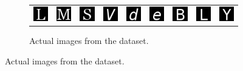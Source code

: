 \begin{figure}
	\begin{subfigure}[t]{\textwidth}
		\begin{tabu} to \textwidth {XXXXXXXXX}
			\includegraphics[scale=1]{tensors/sandc/valid/real/Georgia-76} &
			\includegraphics[scale=1]{tensors/sandc/valid/real/Georgia-77} &
			\includegraphics[scale=1]{tensors/sandc/valid/real/Georgia-83} &
			\includegraphics[scale=1]{tensors/sandc/valid/real/VeraMoIt-86} &
			\includegraphics[scale=1]{tensors/sandc/valid/real/VeraMoIt-100} &
			\includegraphics[scale=1]{tensors/sandc/valid/real/VeraMoIt-101} &
			\includegraphics[scale=1]{tensors/sandc/valid/real/VeraMono-66} &
			\includegraphics[scale=1]{tensors/sandc/valid/real/VeraMono-76} &
			\includegraphics[scale=1]{tensors/sandc/valid/real/VeraMono-89} 
		\end{tabu}
		\caption{Actual images from the dataset.}
	\end{subfigure}
	

\end{figure}
